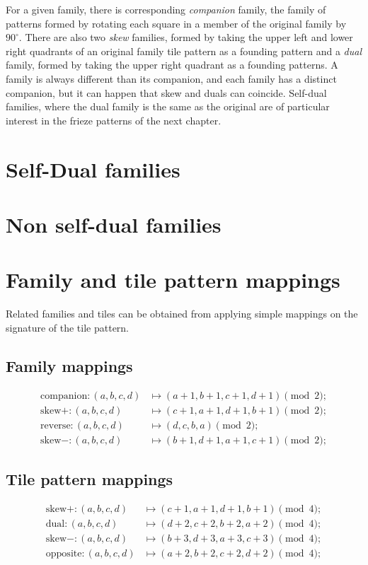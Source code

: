 \documentclass{tufte-book}
\begin{document}
\vspace{0.5cm}

\noindent
For a given family, there is corresponding \textit{companion} family, the family of patterns formed by rotating each square in a member of the original family by $90^{\circ}$.  There are also two \textit{skew} families, formed by taking the upper left and lower right quadrants of an original family tile pattern as a founding pattern and a \textit{dual} family, formed by taking the upper right quadrant as a founding patterns. A family is always different than its companion, and each family has a distinct companion, but it can happen that skew and duals can coincide. Self-dual families, where the dual family is the same as the original are of particular interest in the frieze patterns of the next chapter.

\section{Self-Dual families}


\section{Non self-dual families}


\section{Family and tile pattern mappings}

\marginnote{\centering} 
Related families and tiles can be obtained from applying simple mappings on the signature of the tile pattern.

\subsection{Family mappings}
\begin{align*}        \text{companion}: (a,b,c,d) &\mapsto (a+1, b+1, c+ 1, d+1) \pmod{2};\\
    \text{skew}+ : (a,b,c,d) &\mapsto (c+1, a+1, d+ 1, b+1) \pmod{2};\\
    \text{reverse} : (a,b,c,d) &\mapsto (d, c, b, a) \pmod{2};\\
    \text{skew}- : (a,b,c,d) &\mapsto (b+1, d+1, a+ 1, c+1) \pmod{2};
\end{align*}

\subsection{Tile pattern mappings}
\marginnote{\centering}
\begin{align*}        
    \text{skew}+ : (a,b,c,d) &\mapsto (c+1, a+1, d+ 1, b+1) \pmod{4};\\
    \text{dual} : (a,b,c,d) &\mapsto (d+2, c+2, b+ 2, a+2) \pmod{4};\\
    \text{skew}- : (a,b,c,d) &\mapsto (b+3, d+3, a+ 3, c+3) \pmod{4};\\
    \text{opposite} : (a,b,c,d) &\mapsto (a+2, b+2, c+2, d+2) \pmod{4};
\end{align*}
\end{document}

